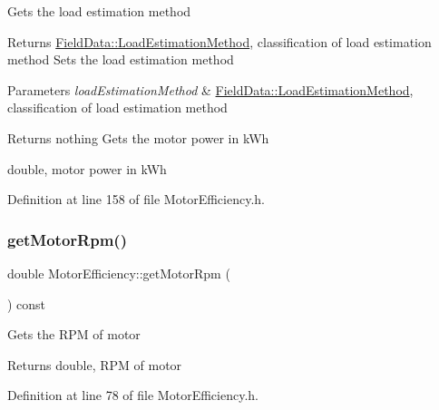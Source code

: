 Gets the load estimation method

\begin{DoxyReturn}{Returns}
\hyperlink{class_field_data_a424e89914ba5684c01bb269dbe3312fd}{Field\+Data\+::\+Load\+Estimation\+Method}, classification of load estimation method Sets the load estimation method
\end{DoxyReturn}

\begin{DoxyParams}{Parameters}
{\em load\+Estimation\+Method} & \hyperlink{class_field_data_a424e89914ba5684c01bb269dbe3312fd}{Field\+Data\+::\+Load\+Estimation\+Method}, classification of load estimation method\\
\hline
\end{DoxyParams}
\begin{DoxyReturn}{Returns}
nothing Gets the motor power in k\+Wh

double, motor power in k\+Wh 
\end{DoxyReturn}


Definition at line 158 of file Motor\+Efficiency.\+h.

\mbox{\label{class_motor_efficiency_ab29655f487e90a73246be6e9bc67c36a}} 
\subsubsection{\texorpdfstring{get\+Motor\+Rpm()}{getMotorRpm()}\hspace{0.1cm}{\footnotesize\ttfamily [1/3]}}
{\footnotesize\ttfamily double Motor\+Efficiency\+::get\+Motor\+Rpm (\begin{DoxyParamCaption}{ }\end{DoxyParamCaption}) const\hspace{0.3cm}{\ttfamily [inline]}}

Gets the R\+PM of motor

\begin{DoxyReturn}{Returns}
double, R\+PM of motor 
\end{DoxyReturn}


Definition at line 78 of file Motor\+Efficiency.\+h.

\mbox{\label{class_motor_efficiency_ab29655f487e90a73246be6e9bc67c36a}} 
